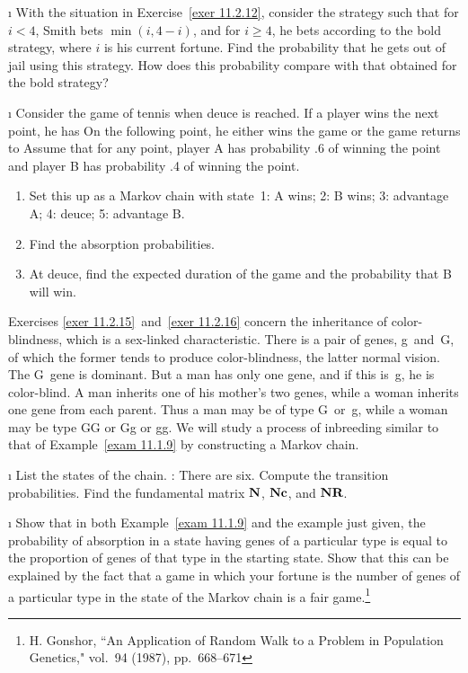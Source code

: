\begin{LJSItem}
\i\label{exer 11.2.13} With the situation in Exercise~\ref{exer 11.2.12},
consider 
the strategy such that for $i < 4$, Smith bets $\min(i,4 - i)$, and for $i \geq
4$, 
he bets according to the bold strategy, where $i$ is his current fortune.  Find
the
probability that he gets out of jail using this strategy.  How does this
probability compare with that obtained for the bold strategy?

\i\label{exer 11.2.14} Consider the game of tennis when \emx
{deuce} is
reached.   If a player wins the next point, he has   On the
following
point, he either wins the game or the game returns to   Assume
that for 
any point, player A has probability .6 of winning the point and player B has 
probability .4 of winning the point.
\begin{enumerate}
\item Set this up as a Markov chain with state~1: A wins; 2: B wins; 3:
advantage A; 4: deuce; 5: advantage B.

\item Find the absorption probabilities.

\item At deuce, find the expected duration of the game and the probability
that B will win.
\end{enumerate}

\medbreak
Exercises \ref{exer 11.2.15}~and~\ref{exer 11.2.16} concern the inheritance of
color-blindness, which is a sex-linked characteristic. 
There is a
pair of genes, g~and~G, of which the former tends to produce color-blindness,
the
latter normal vision.  The G~gene is dominant.  But a man has only one gene,
and if this is~g, he is color-blind.  A man inherits one of his mother's two
genes, while a woman inherits one gene from each parent.  Thus a man may be of
type G~or~g, while a woman may be type GG or Gg or gg.  We will study a process
of inbreeding similar to that of Example~\ref{exam 11.1.9} by constructing a
Markov chain.

\i\label{exer 11.2.15} List the states of the chain.  : There are
six.  Compute the transition probabilities.  Find the fundamental matrix
${\mbox{\bf N}\/}$, 
${\mbox{\bf N}\/}{\mbox{\bf c}\/}$, and ${\mbox{\bf N}\/}{\mbox{\bf R}\/}$.

\i\label{exer 11.2.16} Show that in both Example~\ref{exam 11.1.9} and the
example
just given, the probability of absorption in a state having genes of a
particular type is equal to the proportion of genes of that type in the
starting state.  Show that this can be explained by the fact that a game in
which your fortune is the number of genes of a particular type in the state of
the Markov chain is a fair game.\footnote{H. Gonshor, ``An Application of
Random Walk to a Problem in Population Genetics," 
vol.~94 (1987), pp.~668--671}


\end{LJSItem}
